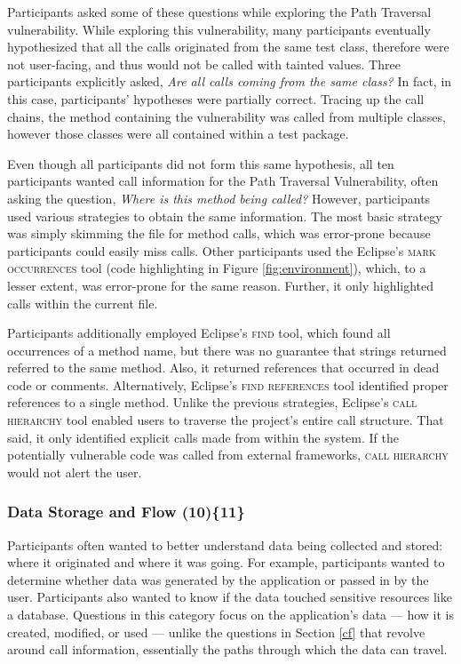 \documentclass{sig-alternate}
\begin{document}
Participants asked some of these questions while exploring the Path Traversal vulnerability.
While exploring this vulnerability, many participants eventually hypothesized that all the calls originated from the same test class, therefore were not user-facing, and thus would not be called with tainted values.
Three participants explicitly asked, \textit{Are all calls coming from the same class?} 
In fact, in this case, participants' hypotheses were partially correct. 
Tracing up the call chains, the method containing the vulnerability was called from multiple classes, however those classes were all contained within a test package.

Even though all participants did not form this same hypothesis, all ten participants wanted call information for the Path Traversal Vulnerability, often asking the question, \textit{Where is this method being called?} 
However, participants used various strategies to obtain the same information.
The most basic strategy was simply skimming the file for method calls, which was error-prone because participants could easily miss calls.
Other participants used the Eclipse's \textsc{mark occurrences} tool (code highlighting in Figure \ref{fig:environment}), which, to a lesser extent, was error-prone for the same reason. 
Further, it only highlighted calls within the current file.

Participants additionally employed Eclipse's \textsc{find} tool, which found all occurrences of a method name, but there was no guarantee that strings returned referred to the same method.
Also, it returned references that occurred in dead code or comments.
Alternatively, Eclipse's \textsc{find references} tool identified proper references to a single method.
Unlike the previous strategies, Eclipse's \textsc{call hierarchy} tool enabled users to traverse the project's entire call structure.
That said, it only identified explicit calls made from within the system. 
If the potentially vulnerable code was called from external frameworks, \textsc{call hierarchy} would not alert the user.
 


\subsubsection{\textbf{Data Storage and Flow (10)\{11\}}}\label{dsf}
Participants often wanted to better understand data being collected and stored: where it originated and where it was going. 
For example, participants wanted to determine whether data was generated by the application or passed in by the user. 
Participants also wanted to know if the data touched sensitive resources like a database.
Questions in this category focus on the application's data --- how it is created, modified, or used --- unlike the questions in Section \ref{cf} that revolve around call information, essentially the paths through which the data can travel.
\\
\end{document}
